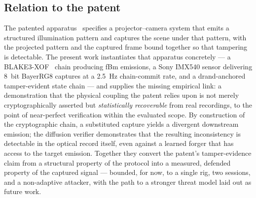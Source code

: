 \subsection{Relation to the patent}

The patented apparatus~\cite{patent2025} specifies a projector--camera system that emits a structured illumination pattern and captures the scene under that pattern, with the projected pattern and the captured frame bound together so that tampering is detectable. The present work instantiates that apparatus concretely --- a BLAKE3-XOF~\cite{blake3} chain producing fBm emissions, a Sony IMX540 sensor delivering \SI{8}{bit} BayerRG8 captures at a \SI{2.5}{\hertz} chain-commit rate, and a drand-anchored~\cite{drandbeacon} tamper-evident state chain --- and supplies the missing empirical link: a demonstration that the physical coupling the patent relies upon is not merely cryptographically asserted but \emph{statistically recoverable} from real recordings, to the point of near-perfect verification within the evaluated scope. By construction of the cryptographic chain, a substituted capture yields a divergent downstream emission; the diffusion verifier demonstrates that the resulting inconsistency is detectable in the optical record itself, even against a learned forger that has access to the target emission. Together they convert the patent's tamper-evidence claim from a structural property of the protocol into a measured, defended property of the captured signal --- bounded, for now, to a single rig, two sessions, and a non-adaptive attacker, with the path to a stronger threat model laid out as future work.

